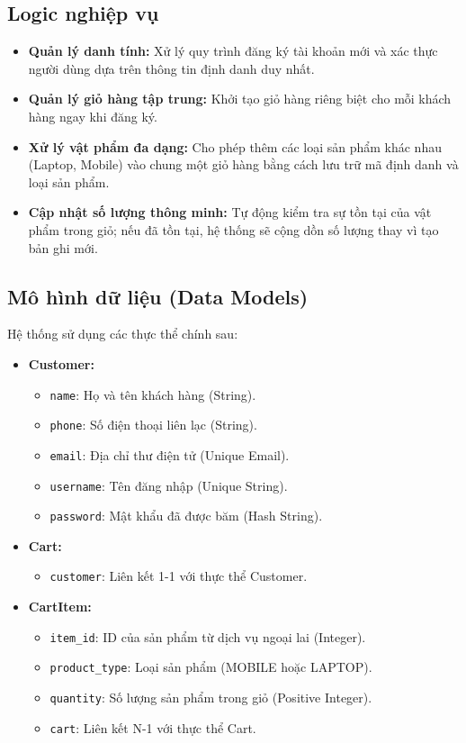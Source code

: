 \documentclass[12pt,a4paper]{report}
\begin{document}
\subsection{Logic nghiệp vụ}
\begin{itemize}
    \item \textbf{Quản lý danh tính:} Xử lý quy trình đăng ký tài khoản mới và xác thực người dùng dựa trên thông tin định danh duy nhất.
    \item \textbf{Quản lý giỏ hàng tập trung:} Khởi tạo giỏ hàng riêng biệt cho mỗi khách hàng ngay khi đăng ký.
    \item \textbf{Xử lý vật phẩm đa dạng:} Cho phép thêm các loại sản phẩm khác nhau (Laptop, Mobile) vào chung một giỏ hàng bằng cách lưu trữ mã định danh và loại sản phẩm.
    \item \textbf{Cập nhật số lượng thông minh:} Tự động kiểm tra sự tồn tại của vật phẩm trong giỏ; nếu đã tồn tại, hệ thống sẽ cộng dồn số lượng thay vì tạo bản ghi mới.
\end{itemize}

\subsection{Mô hình dữ liệu (Data Models)}
Hệ thống sử dụng các thực thể chính sau:
\begin{itemize}
    \item \textbf{Customer:}
        \begin{itemize}
            \item \texttt{name}: Họ và tên khách hàng (String).
            \item \texttt{phone}: Số điện thoại liên lạc (String).
            \item \texttt{email}: Địa chỉ thư điện tử (Unique Email).
            \item \texttt{username}: Tên đăng nhập (Unique String).
            \item \texttt{password}: Mật khẩu đã được băm (Hash String).
        \end{itemize}
    \item \textbf{Cart:}
        \begin{itemize}
            \item \texttt{customer}: Liên kết 1-1 với thực thể Customer.
        \end{itemize}
    \item \textbf{CartItem:}
        \begin{itemize}
            \item \texttt{item\_id}: ID của sản phẩm từ dịch vụ ngoại lai (Integer).
            \item \texttt{product\_type}: Loại sản phẩm (MOBILE hoặc LAPTOP).
            \item \texttt{quantity}: Số lượng sản phẩm trong giỏ (Positive Integer).
            \item \texttt{cart}: Liên kết N-1 với thực thể Cart.
        \end{itemize}
\end{itemize}
\end{document}
